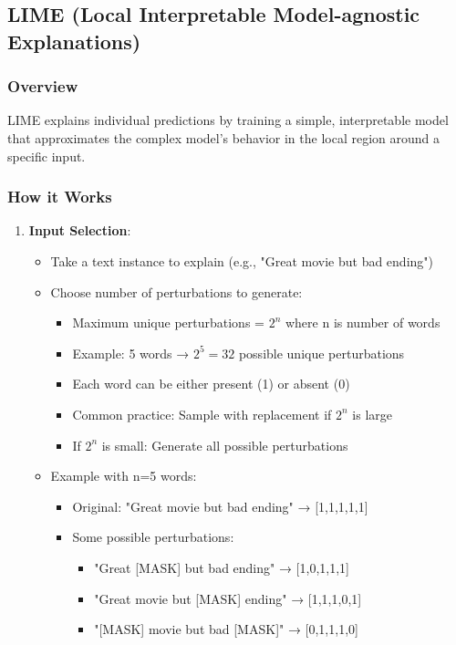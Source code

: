 \documentclass{article}
\begin{document}
\subsection{LIME (Local Interpretable Model-agnostic Explanations)}

\subsubsection{Overview}
LIME explains individual predictions by training a simple, interpretable model that approximates the complex model's behavior in the local region around a specific input.

\subsubsection{How it Works}
\begin{enumerate}
    \item \textbf{Input Selection}:
        \begin{itemize}
            \item Take a text instance to explain (e.g., "Great movie but bad ending")
            \item Choose number of perturbations to generate:
                \begin{itemize}
                    \item Maximum unique perturbations = $2^n$ where n is number of words
                    \item Example: 5 words → $2^5 = 32$ possible unique perturbations
                    \item Each word can be either present (1) or absent (0)
                    \item Common practice: Sample with replacement if $2^n$ is large
                    \item If $2^n$ is small: Generate all possible perturbations
                \end{itemize}
            \item Example with n=5 words:
                \begin{itemize}
                    \item Original: "Great movie but bad ending" → [1,1,1,1,1]
                    \item Some possible perturbations:
                        \begin{itemize}
                            \item "Great [MASK] but bad ending" → [1,0,1,1,1]
                            \item "Great movie but [MASK] ending" → [1,1,1,0,1]
                            \item "[MASK] movie but bad [MASK]" → [0,1,1,1,0]
                        \end{itemize}
                \end{itemize}
        \end{itemize}
    

\end{enumerate}
\end{document}
